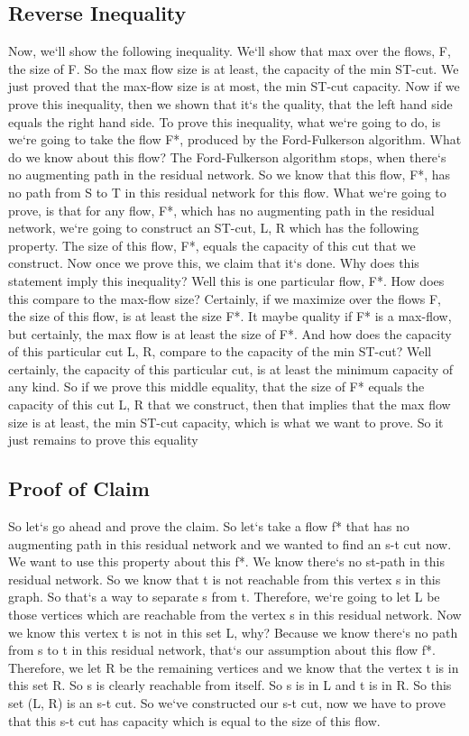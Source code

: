 \subsection{Reverse Inequality}
Now, we`ll show the following inequality.
We`ll show that max over the flows, F, the size of F\@.
So the max flow size is at least, the capacity of the min ST-cut.
We just proved that the max-flow size is at most, the min ST-cut capacity.
Now if we prove this inequality, then we shown that it`s the quality, that the left hand side equals the right hand side.
To prove this inequality, what we`re going to do, is we`re going to take the flow F*, produced by the Ford-Fulkerson algorithm.
What do we know about this flow? The Ford-Fulkerson algorithm stops, when there`s no augmenting path in the residual network.
So we know that this flow, F*, has no path from S to T in this residual network for this flow.
What we`re going to prove, is that for any flow, F*, which has no augmenting path in the residual network, we`re going to construct an ST-cut, L, R which has the following property.
The size of this flow, F*, equals the capacity of this cut that we construct.
Now once we prove this, we claim that it`s done.
Why does this statement imply this inequality? Well this is one particular flow, F*.
How does this compare to the max-flow size? Certainly, if we maximize over the flows F, the size of this flow, is at least the size F*.
It maybe quality if F* is a max-flow, but certainly, the max flow is at least the size of F*.
And how does the capacity of this particular cut L, R, compare to the capacity of the min ST-cut? Well certainly, the capacity of this particular cut, is at least the minimum capacity of any kind.
So if we prove this middle equality, that the size of F* equals the capacity of this cut L, R that we construct, then that implies that the max flow size is at least, the min ST-cut capacity, which is what we want to prove.
So it just remains to prove this equality

\subsection{Proof of Claim}
So let`s go ahead and prove the claim.
So let`s take a flow f* that has no augmenting path in this residual network and we wanted to find an s-t cut now.
We want to use this property about this f*.
We know there`s no st-path in this residual network.
So we know that t is not reachable from this vertex s in this graph.
So that`s a way to separate s from t.
Therefore, we`re going to let L be those vertices which are reachable from the vertex s in this residual network.
Now we know this vertex t is not in this set L, why? Because we know there`s no path from s to t in this residual network, that`s our assumption about this flow f*.
Therefore, we let R be the remaining vertices and we know that the vertex t is in this set R\@.
So s is clearly reachable from itself.
So s is in L and t is in R\@.
So this set (L, R) is an s-t cut.
So we`ve constructed our s-t cut, now we have to prove that this s-t cut has capacity which is equal to the size of this flow.

